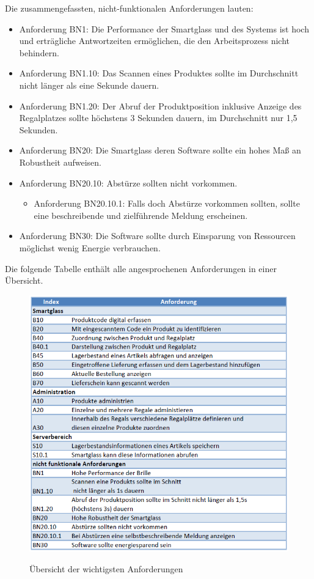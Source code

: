 Die zusammengefassten, nicht-funktionalen Anforderungen lauten:
\begin{itemize}
	\item Anforderung BN1: Die Performance der Smartglass und des Systems ist hoch und erträgliche Antwortzeiten ermöglichen, die den Arbeitsprozess nicht behindern.
	\item Anforderung BN1.10: Das Scannen eines Produktes sollte im Durchschnitt nicht länger als eine Sekunde dauern.
	\item Anforderung BN1.20: Der Abruf der Produktposition inklusive Anzeige des Regalplatzes sollte höchstens 3 Sekunden dauern, im Durchschnitt nur 1,5 Sekunden.
	\item Anforderung BN20: Die Smartglass \bzw deren Software sollte ein hohes Maß an Robustheit aufweisen.
	\item Anforderung BN20.10: Abstürze sollten nicht vorkommen. 
	\begin{itemize}
		\item Anforderung BN20.10.1: Falls doch Abstürze vorkommen sollten, sollte eine beschreibende und zielführende Meldung erscheinen.
	\end{itemize}
	\item Anforderung BN30: Die Software sollte durch Einsparung von Ressourcen möglichst wenig Energie verbrauchen.
\end{itemize}

Die folgende Tabelle enthält alle angesprochenen Anforderungen in einer Übersicht. 
\begin{figure}[H]
	\centering
	{\includegraphics[scale=0.9]{Bilder/Abbildungen/anforderungen_zusammenfassung.png}}
	\caption{Übersicht der wichtigsten Anforderungen}
	\label{fig:anforderungen_uebers}
\end{figure}